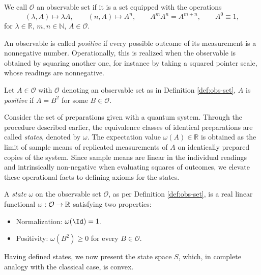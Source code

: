 \begin{definition}\label{def:obs-set}
	We call $\mathcal{O}$ an observable set if it is a set equipped
	with the operations
	\[
	(\lambda,A)\longmapsto \lambda A, \qquad (n,A)\longmapsto A^n,
	\qquad A^mA^n=A^{m+n}, \qquad A^0\equiv 1,
	\]
	for $\lambda\in\mathbb{R}$, $m,n\in\mathbb{N}$, $A\in\mathcal{O}$.
\end{definition}

An observable is called \emph{positive} if every possible outcome
of its measurement is a nonnegative number. Operationally, this is realized when the observable is obtained by squaring another one, for instance by taking a squared pointer scale, whose readings are nonnegative.

\begin{definition}
	\label{def:positive-obs}
	Let $A\in\mathcal{O}$ with $\mathcal{O}$ denoting an observable set as in Definition \ref{def:obs-set}, $A$ is \emph{positive} if $A=B^2$ for some
	$B\in\mathcal{O}$.
\end{definition}

Consider the set of preparations given with a quantum system. Through the procedure described earlier, the equivalence classes of identical preparations are called \emph{states}, denoted by $\omega$. The expectation value $\omega(A) \in \mathbb{R}$ is obtained as the limit of sample means of replicated measurements of $A$ on identically prepared copies of the system. Since sample means are linear in the individual readings and intrinsically non-negative when evaluating squares of outcomes, we elevate these operational facts to defining axioms for the states.

	\begin{definition}[State]\label{def:q-state}
		A \emph{state} $\omega$ on the observable set $\mathcal{O}$, as per Definition \ref{def:obs-set}, is a real linear functional $\omega: \mathcal{O} \to \R$ satisfying two properties:
		
		\begin{itemize}
			\item Normalization: $\omega(\Id) = 1$.
			\item Positivity: $\omega(B^2) \ge 0$ for every $B \in \mathcal{O}$.
		\end{itemize}
	\end{definition}
	
	\noindent Having defined states, we now present the state space $S$, which, in complete analogy with the classical case, is convex.
	
